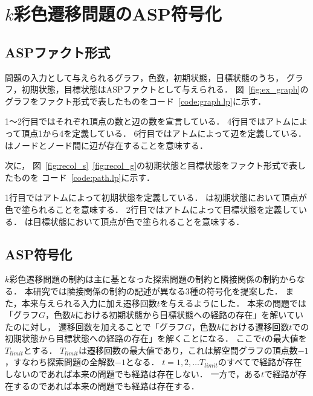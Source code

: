 \chapter{$k$彩色遷移問題のASP符号化} \label{chap:proposal}

\section{ASPファクト形式}
問題の入力として与えられるグラフ，色数，初期状態，目標状態のうち，
グラフ，初期状態，目標状態はASPファクトとして与えられる．
図~\ref{fig:ex_graph}のグラフをファクト形式で表したものをコード~\ref{code:graph.lp}に示す．



1～2行目ではそれぞれ頂点の数と辺の数を宣言している．
4行目ではアトムによって頂点1から4を定義している．
6行目ではアトムによって辺を定義している．
はノードとノード間に辺が存在することを意味する．

次に， 図~\ref{fig:recol_s}~\ref{fig:recol_g}の初期状態と目標状態をファクト形式で表したものを
コード~\ref{code:path.lp}に示す．



1行目ではアトムによって初期状態を定義している．
は初期状態において頂点が色で塗られることを意味する．
2行目ではアトムによって目標状態を定義している．
は目標状態において頂点が色で塗られることを意味する．

\section{ASP符号化}
$k$彩色遷移問題の制約は主に基となった探索問題の制約と隣接関係の制約からなる．
本研究では隣接関係の制約の記述が異なる3種の符号化を提案した．
また，本来与えられる入力に加え遷移回数$t$を与えるようにした．
本来の問題では「グラフ$G$，色数$k$における初期状態から目標状態への経路の存在」を解いていたのに対し，
遷移回数を加えることで「グラフ$G$，色数$k$における遷移回数$t$での初期状態から目標状態への経路の存在」を解くことになる．
ここで$t$の最大値を$T_{limit}$とする．
$T_{limit}$は遷移回数の最大値であり，これは解空間グラフの頂点数$-1$，すなわち探索問題の全解数$-1$となる．
$t=1, 2, \dots T_{limit}$のすべてで経路が存在しないのであれば本来の問題でも経路は存在しない．
一方で，ある$t$で経路が存在するのであれば本来の問題でも経路は存在する．

